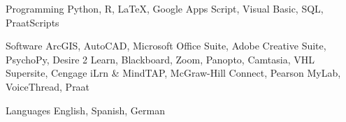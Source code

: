 


\begin{cvskills}


\cvskill
{Programming} %
{Python, R, LaTeX, Google Apps Script, Visual Basic, SQL, PraatScripts} %


\cvskill
{Software} %
{ArcGIS, AutoCAD, Microsoft Office Suite, Adobe Creative Suite, PsychoPy,
Desire 2 Learn, Blackboard, Zoom, Panopto, \newline Camtasia, VHL Supersite, Cengage iLrn \& MindTAP, McGraw-Hill Connect, Pearson MyLab, VoiceThread, Praat} %


\cvskill
{Languages} %
{English, Spanish, German} %

\vspace{-7mm}
\end{cvskills}